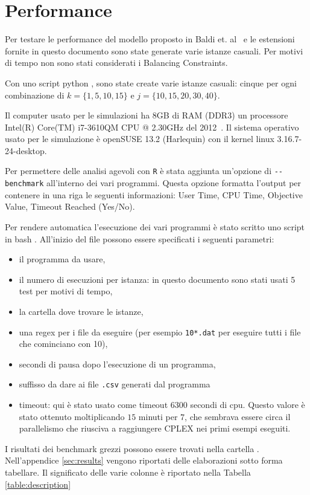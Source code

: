 \section{Performance}
\label{sec:benchmark}
Per testare le performance del modello proposto in Baldi et. 
al~\cite{Baldi20129802} e le estensioni fornite
in questo documento sono state generate varie istanze casuali.
Per motivi di tempo non sono stati considerati i Balancing Constraints. 

Con uno script python , sono state create varie
istanze casuali: cinque per ogni 
combinazione di $k = \{1,5,10,15\}$ e $j = \{10,15,20,30,40\}$. 

Il computer usato per le simulazioni ha 8GB di RAM (DDR3) un processore 
Intel(R) Core(TM) i7-3610QM CPU @ 2.30GHz del 2012~\cite{cpu}.
Il sistema operativo usato per le simulazione è openSUSE 13.2 (Harlequin) con
il kernel linux 3.16.7-24-desktop.

Per permettere delle analisi agevoli con \verb|R| è stata aggiunta un'opzione di
\verb|--benchmark| all'interno dei vari programmi. 
Questa opzione formatta l'output per contenere in una riga le seguenti 
informazioni: User Time, CPU Time, Objective Value, Timeout Reached (Yes/No).

Per rendere automatica l'esecuzione dei vari programmi è stato scritto uno 
script in bash . 
All'inizio del file possono essere specificati i seguenti parametri:
\begin{itemize}
\item il programma da usare, 
\item il numero di esecuzioni per istanza: in questo documento sono stati usati
5 test per motivi di tempo,
\item la cartella dove trovare le istanze, 
\item una regex per i file da eseguire  (per esempio \verb|10*.dat| per eseguire
 tutti i file che cominciano con 10), 
\item secondi di pausa dopo l'esecuzione di un programma,
\item suffisso da dare ai file \verb|.csv| generati dal programma
\item timeout: qui è stato usato come timeout $6300$ secondi di cpu. Questo valore
è stato ottenuto moltiplicando $15$ minuti per $7$, che sembrava essere
circa il parallelismo che riusciva a raggiungere CPLEX nei primi esempi eseguiti.
\end{itemize}

I risultati dei benchmark grezzi possono essere trovati nella cartella 
. Nell'appendice  \ref{sec:results} vengono riportati delle
elaborazioni sotto forma tabellare.
Il significato delle varie colonne è riportato nella Tabella \ref{table:description}

